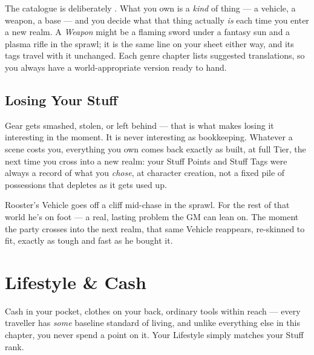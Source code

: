 The catalogue is deliberately . What you own is a
\emph{kind} of thing --- a vehicle, a weapon, a base --- and you
decide what that thing actually \emph{is} each time you enter a new realm.
A \emph{Weapon} might be a flaming sword under a fantasy sun and a
plasma rifle in the sprawl; it is the same line on your sheet either way,
and its tags travel with it unchanged. Each genre chapter lists suggested
translations, so you always have a world-appropriate version ready to
hand.

\subsection*{Losing Your Stuff}
Gear gets smashed, stolen, or left behind --- that is what makes losing
it interesting in the moment. It is never interesting as bookkeeping.
Whatever a scene costs you, everything you own comes back exactly as
built, at full Tier, the next time you cross into a new realm: your
Stuff Points and Stuff Tags were always a record of what you
\emph{chose}, at character creation, not a fixed pile of possessions
that depletes as it gets used up.

\begin{example}
Rooster's Vehicle goes off a cliff mid-chase in the sprawl. For the rest
of that world he's on foot --- a real, lasting problem the GM can lean
on. The moment the party crosses into the next realm, that same Vehicle
reappears, re-skinned to fit, exactly as tough and fast as he bought it.
\end{example}

\section{Lifestyle \& Cash}
Cash in your pocket, clothes on your back, ordinary tools within reach
--- every traveller has \emph{some} baseline standard of living, and
unlike everything else in this chapter, you never spend a point on it.
Your Lifestyle simply matches your Stuff rank.


